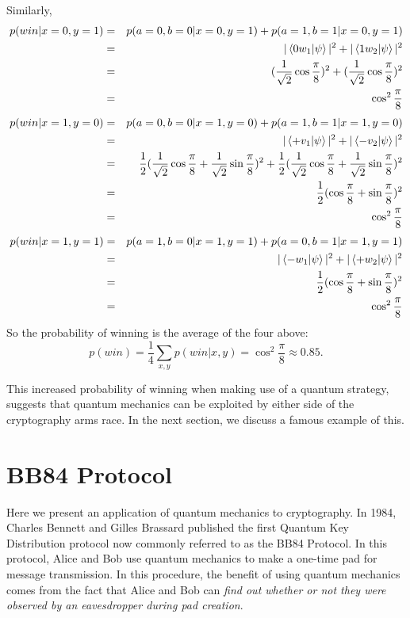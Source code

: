 Similarly,
\begin{eqnarray*}
p(win|x=0,y=1)&=&p(a=0, b=0|x=0, y=1)+p(a=1, b=1|x=0, y=1)\\
&=&|\braket{0 w_1|\psi}|^2 + |\braket{1 w_2|\psi}|^2\\
&=&(\frac{1}{\sqrt{2}}\cos\frac{\pi}{8})^2+(\frac{1}{\sqrt{2}}\cos\frac{\pi}{8})^2\\
&=&\cos^2 \frac{\pi}{8}
\end{eqnarray*}
\begin{eqnarray*}
p(win|x=1,y=0)&=&p(a=0, b=0|x=1, y=0)+p(a=1, b=1|x=1, y=0)\\
&=&|\braket{+ v_1|\psi}|^2 + |\braket{- v_2|\psi}|^2\\
&=&\frac{1}{2}(\frac{1}{\sqrt{2}}\cos\frac{\pi}{8}+\frac{1}{\sqrt{2}}\sin\frac{\pi}{8})^2+\frac{1}{2}(\frac{1}{\sqrt{2}}\cos\frac{\pi}{8}+\frac{1}{\sqrt{2}}\sin\frac{\pi}{8})^2\\
&=&\frac{1}{2}(\cos\frac{\pi}{8}+\sin\frac{\pi}{8})^2\\
&=&\cos^2 \frac{\pi}{8}
\end{eqnarray*}
\begin{eqnarray*}
p(win|x=1,y=1)&=&p(a=1, b=0|x=1, y=1)+p(a=0, b=1|x=1, y=1)\\
&=&|\braket{- w_1|\psi}|^2 + |\braket{+ w_2|\psi}|^2\\
&=&\frac{1}{2}(\cos\frac{\pi}{8}+\sin\frac{\pi}{8})^2\\
&=&\cos^2 \frac{\pi}{8}
\end{eqnarray*}
So the probability of winning is the average of the four above:
\begin{equation*}
    p(win)=\frac{1}{4}\sum_{x,y}p(win|x,y)=\cos^2 \frac{\pi}{8} \approx 0.85.
\end{equation*}


This increased probability of winning when making use of a quantum strategy, suggests that quantum mechanics can be exploited by either side of the cryptography arms race.  In the next section, we discuss a famous example of this.




\pagebreak

\section{BB84 Protocol}
Here we present an application of quantum mechanics to cryptography.  In 1984, Charles Bennett and Gilles Brassard published the first Quantum Key Distribution protocol \cite{Bennett1984} now commonly referred to as the BB84 Protocol. In this protocol, Alice and Bob use quantum mechanics to make a one-time pad for message transmission.  In this procedure, the benefit of using quantum mechanics comes from the fact that Alice and Bob can {\emph{find out whether or not they were observed by an eavesdropper during pad creation}}. 

